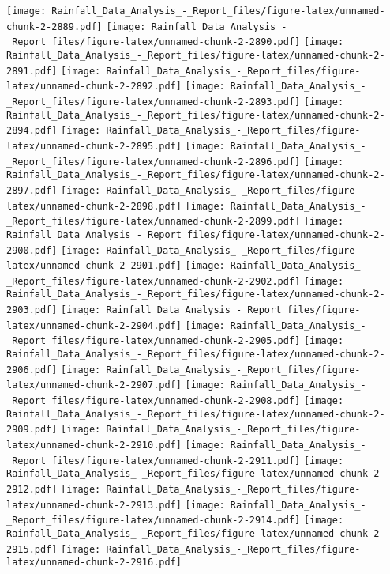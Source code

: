 \documentclass[
]{article}
\begin{document}
\texttt{[image: Rainfall\_Data\_Analysis\_-\_Report\_files/figure-latex/unnamed-chunk-2-2889.pdf]}
\texttt{[image: Rainfall\_Data\_Analysis\_-\_Report\_files/figure-latex/unnamed-chunk-2-2890.pdf]}
\texttt{[image: Rainfall\_Data\_Analysis\_-\_Report\_files/figure-latex/unnamed-chunk-2-2891.pdf]}
\texttt{[image: Rainfall\_Data\_Analysis\_-\_Report\_files/figure-latex/unnamed-chunk-2-2892.pdf]}
\texttt{[image: Rainfall\_Data\_Analysis\_-\_Report\_files/figure-latex/unnamed-chunk-2-2893.pdf]}
\texttt{[image: Rainfall\_Data\_Analysis\_-\_Report\_files/figure-latex/unnamed-chunk-2-2894.pdf]}
\texttt{[image: Rainfall\_Data\_Analysis\_-\_Report\_files/figure-latex/unnamed-chunk-2-2895.pdf]}
\texttt{[image: Rainfall\_Data\_Analysis\_-\_Report\_files/figure-latex/unnamed-chunk-2-2896.pdf]}
\texttt{[image: Rainfall\_Data\_Analysis\_-\_Report\_files/figure-latex/unnamed-chunk-2-2897.pdf]}
\texttt{[image: Rainfall\_Data\_Analysis\_-\_Report\_files/figure-latex/unnamed-chunk-2-2898.pdf]}
\texttt{[image: Rainfall\_Data\_Analysis\_-\_Report\_files/figure-latex/unnamed-chunk-2-2899.pdf]}
\texttt{[image: Rainfall\_Data\_Analysis\_-\_Report\_files/figure-latex/unnamed-chunk-2-2900.pdf]}
\texttt{[image: Rainfall\_Data\_Analysis\_-\_Report\_files/figure-latex/unnamed-chunk-2-2901.pdf]}
\texttt{[image: Rainfall\_Data\_Analysis\_-\_Report\_files/figure-latex/unnamed-chunk-2-2902.pdf]}
\texttt{[image: Rainfall\_Data\_Analysis\_-\_Report\_files/figure-latex/unnamed-chunk-2-2903.pdf]}
\texttt{[image: Rainfall\_Data\_Analysis\_-\_Report\_files/figure-latex/unnamed-chunk-2-2904.pdf]}
\texttt{[image: Rainfall\_Data\_Analysis\_-\_Report\_files/figure-latex/unnamed-chunk-2-2905.pdf]}
\texttt{[image: Rainfall\_Data\_Analysis\_-\_Report\_files/figure-latex/unnamed-chunk-2-2906.pdf]}
\texttt{[image: Rainfall\_Data\_Analysis\_-\_Report\_files/figure-latex/unnamed-chunk-2-2907.pdf]}
\texttt{[image: Rainfall\_Data\_Analysis\_-\_Report\_files/figure-latex/unnamed-chunk-2-2908.pdf]}
\texttt{[image: Rainfall\_Data\_Analysis\_-\_Report\_files/figure-latex/unnamed-chunk-2-2909.pdf]}
\texttt{[image: Rainfall\_Data\_Analysis\_-\_Report\_files/figure-latex/unnamed-chunk-2-2910.pdf]}
\texttt{[image: Rainfall\_Data\_Analysis\_-\_Report\_files/figure-latex/unnamed-chunk-2-2911.pdf]}
\texttt{[image: Rainfall\_Data\_Analysis\_-\_Report\_files/figure-latex/unnamed-chunk-2-2912.pdf]}
\texttt{[image: Rainfall\_Data\_Analysis\_-\_Report\_files/figure-latex/unnamed-chunk-2-2913.pdf]}
\texttt{[image: Rainfall\_Data\_Analysis\_-\_Report\_files/figure-latex/unnamed-chunk-2-2914.pdf]}
\texttt{[image: Rainfall\_Data\_Analysis\_-\_Report\_files/figure-latex/unnamed-chunk-2-2915.pdf]}
\texttt{[image: Rainfall\_Data\_Analysis\_-\_Report\_files/figure-latex/unnamed-chunk-2-2916.pdf]}
\end{document}
